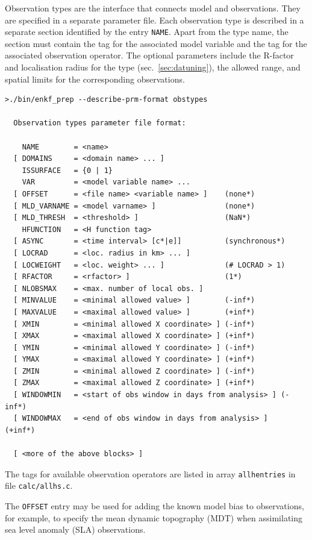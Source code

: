 \documentclass[11pt]{report}
\begin{document}
Observation types are the interface that connects model and observations.
They are specified in a separate parameter file.
Each observation type is described in a separate section identified by the entry \verb|NAME|.
Apart from the type name, the section must contain the tag for the associated model variable and the tag for the associated observation operator.
The optional parameters include the R-factor and localisation radius for the type (sec.~\ref{sec:datuning}), the allowed range, and spatial limits for the corresponding observations.
\begin{Verbatim}[frame=single,fontsize=\footnotesize]
>./bin/enkf_prep --describe-prm-format obstypes

  Observation types parameter file format:

    NAME        = <name>
  [ DOMAINS     = <domain name> ... ]
    ISSURFACE   = {0 | 1}
    VAR         = <model variable name> ...
  [ OFFSET      = <file name> <variable name> ]    (none*)
  [ MLD_VARNAME = <model varname> ]                (none*)
  [ MLD_THRESH  = <threshold> ]                    (NaN*)
    HFUNCTION   = <H function tag>
  [ ASYNC       = <time interval> [c*|e]]          (synchronous*)
  [ LOCRAD      = <loc. radius in km> ... ]
  [ LOCWEIGHT   = <loc. weight> ... ]              (# LOCRAD > 1)
  [ RFACTOR     = <rfactor> ]                      (1*)
  [ NLOBSMAX    = <max. number of local obs. ]
  [ MINVALUE    = <minimal allowed value> ]        (-inf*)
  [ MAXVALUE    = <maximal allowed value> ]        (+inf*)
  [ XMIN        = <minimal allowed X coordinate> ] (-inf*)
  [ XMAX        = <maximal allowed X coordinate> ] (+inf*)
  [ YMIN        = <minimal allowed Y coordinate> ] (-inf*)
  [ YMAX        = <maximal allowed Y coordinate> ] (+inf*)
  [ ZMIN        = <minimal allowed Z coordinate> ] (-inf*)
  [ ZMAX        = <maximal allowed Z coordinate> ] (+inf*)
  [ WINDOWMIN   = <start of obs window in days from analysis> ] (-inf*)
  [ WINDOWMAX   = <end of obs window in days from analysis> ]   (+inf*)

  [ <more of the above blocks> ]
\end{Verbatim}

The tags for available observation operators are listed in array \verb|allhentries| in file \verb|calc/allhs.c|.

The \verb|OFFSET| entry may be used for adding the known model bias to observations, for example, to specify the mean dynamic topography (MDT) when assimilating sea level anomaly (SLA) observations.
\end{document}

